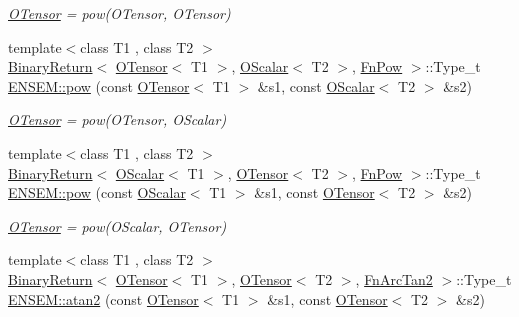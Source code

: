 \begin{DoxyCompactItemize}
\begin{DoxyCompactList}\small\item\em \mbox{\hyperlink{classENSEM_1_1OTensor}{O\+Tensor}} = pow(\+O\+Tensor, O\+Tensor) \end{DoxyCompactList}\item 
{\footnotesize template$<$class T1 , class T2 $>$ }\\\mbox{\hyperlink{structENSEM_1_1BinaryReturn}{Binary\+Return}}$<$ \mbox{\hyperlink{classENSEM_1_1OTensor}{O\+Tensor}}$<$ T1 $>$, \mbox{\hyperlink{classENSEM_1_1OScalar}{O\+Scalar}}$<$ T2 $>$, \mbox{\hyperlink{structENSEM_1_1FnPow}{Fn\+Pow}} $>$\+::Type\+\_\+t \mbox{\hyperlink{group__obstensor_ga5d6fdaa96c08e10d2006c495cb0af217}{E\+N\+S\+E\+M\+::pow}} (const \mbox{\hyperlink{classENSEM_1_1OTensor}{O\+Tensor}}$<$ T1 $>$ \&s1, const \mbox{\hyperlink{classENSEM_1_1OScalar}{O\+Scalar}}$<$ T2 $>$ \&s2)
\begin{DoxyCompactList}\small\item\em \mbox{\hyperlink{classENSEM_1_1OTensor}{O\+Tensor}} = pow(\+O\+Tensor, O\+Scalar) \end{DoxyCompactList}\item 
{\footnotesize template$<$class T1 , class T2 $>$ }\\\mbox{\hyperlink{structENSEM_1_1BinaryReturn}{Binary\+Return}}$<$ \mbox{\hyperlink{classENSEM_1_1OScalar}{O\+Scalar}}$<$ T1 $>$, \mbox{\hyperlink{classENSEM_1_1OTensor}{O\+Tensor}}$<$ T2 $>$, \mbox{\hyperlink{structENSEM_1_1FnPow}{Fn\+Pow}} $>$\+::Type\+\_\+t \mbox{\hyperlink{group__obstensor_ga5f02683bb668851c7df8a84ba438b0fb}{E\+N\+S\+E\+M\+::pow}} (const \mbox{\hyperlink{classENSEM_1_1OScalar}{O\+Scalar}}$<$ T1 $>$ \&s1, const \mbox{\hyperlink{classENSEM_1_1OTensor}{O\+Tensor}}$<$ T2 $>$ \&s2)
\begin{DoxyCompactList}\small\item\em \mbox{\hyperlink{classENSEM_1_1OTensor}{O\+Tensor}} = pow(\+O\+Scalar, O\+Tensor) \end{DoxyCompactList}\item 
{\footnotesize template$<$class T1 , class T2 $>$ }\\\mbox{\hyperlink{structENSEM_1_1BinaryReturn}{Binary\+Return}}$<$ \mbox{\hyperlink{classENSEM_1_1OTensor}{O\+Tensor}}$<$ T1 $>$, \mbox{\hyperlink{classENSEM_1_1OTensor}{O\+Tensor}}$<$ T2 $>$, \mbox{\hyperlink{structENSEM_1_1FnArcTan2}{Fn\+Arc\+Tan2}} $>$\+::Type\+\_\+t \mbox{\hyperlink{group__obstensor_ga167556ae7bebc48d05e83003206f36dd}{E\+N\+S\+E\+M\+::atan2}} (const \mbox{\hyperlink{classENSEM_1_1OTensor}{O\+Tensor}}$<$ T1 $>$ \&s1, const \mbox{\hyperlink{classENSEM_1_1OTensor}{O\+Tensor}}$<$ T2 $>$ \&s2)

\end{DoxyCompactItemize}
